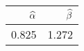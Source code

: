 \begin{table}[ht]
\centering
\begin{tabular}{rr}
  \hline
$\widehat{\alpha}$ & $\widehat{\beta}$ \\ 
  \hline
0.825 & 1.272 \\ 
   \hline
\end{tabular}
\end{table}
